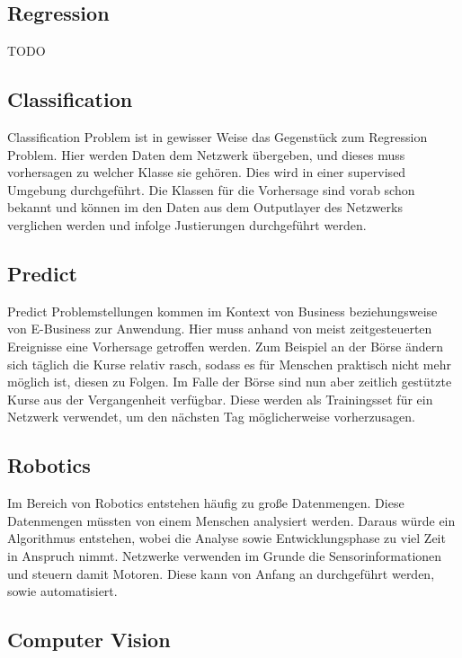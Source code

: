 \subsection{Regression}
\label{subsec:Regression}

TODO

\subsection{Classification}
\label{subsec:Classification}

Classification Problem ist in gewisser Weise das Gegenstück zum Regression Problem. 
Hier werden Daten dem Netzwerk übergeben, und dieses muss vorhersagen zu welcher Klasse sie gehören. Dies wird in einer supervised Umgebung durchgeführt. 
Die Klassen für die Vorhersage sind vorab schon bekannt und können im den Daten aus dem Outputlayer des Netzwerks  verglichen werden und infolge Justierungen durchgeführt werden.

\subsection{Predict}
\label{subsec:Predict}

Predict Problemstellungen kommen im Kontext von Business beziehungsweise von E-Business zur Anwendung. 
Hier muss anhand von meist zeitgesteuerten Ereignisse eine Vorhersage getroffen werden. 
Zum Beispiel an der Börse ändern sich täglich die Kurse relativ rasch, sodass es für Menschen praktisch nicht mehr möglich ist, diesen zu Folgen. 
Im Falle der Börse sind nun aber zeitlich gestützte Kurse aus der Vergangenheit verfügbar. 
Diese werden als Trainingsset für ein Netzwerk verwendet, um den nächsten Tag möglicherweise vorherzusagen. 

\subsection{Robotics}
\label{subsec:Robotics}

Im Bereich von Robotics entstehen häufig zu große Datenmengen. 
Diese Datenmengen müssten von einem Menschen analysiert werden. 
Daraus würde ein Algorithmus entstehen, wobei die Analyse sowie Entwicklungsphase zu viel Zeit in Anspruch nimmt. 
Netzwerke verwenden im Grunde die Sensorinformationen und steuern damit Motoren. 
Diese kann von Anfang an durchgeführt werden, sowie automatisiert.

\subsection{Computer Vision}
\label{subsec:Cumputer Vision}


